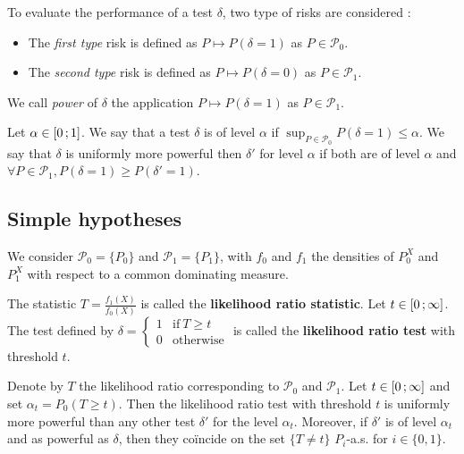 	To evaluate the performance of a test $\delta$, two type of risks are considered :
	\begin{itemize}
		\item[\textbullet] The \emph{first type} risk is defined as $P \mapsto P(\delta = 1)$ as $P \in \mathcal{P}_0$.
		\item[\textbullet] The \emph{second type} risk is defined as $P \mapsto P(\delta = 0)$ as $P \in \mathcal{P}_1$.
	\end{itemize}
	We call \emph{power} of $\delta$ the application $P \mapsto P(\delta = 1)$ as $P \in \mathcal{P}_1$.

	\begin{defn}
		Let $\alpha \in \mathopen{}\mathclose{\left[0\mathclose{}\mathpunct{};1\right]}$.
		We say that a test $\delta$ is of level $\alpha$ if $\sup_{P \in \mathcal{P}_0} P(\delta = 1) \leq \alpha$.
		We say that $\delta$ is uniformly more powerful then $\delta'$ for level $\alpha$ if both are of level $\alpha$ and $\forall P \in \mathcal{P}_1, P(\delta = 1) \geq P(\delta' = 1)$.
	\end{defn}


\subsection{Simple hypotheses}

	We consider $\mathcal{P}_0 = \{ P_0 \}$ and $\mathcal{P}_1 = \{ P_1 \}$, with $f_0$ and $f_1$ the densities of $P_0^X$ and $P_1^X$ with respect to a common dominating measure.
	
	\begin{defn}
		The statistic $T = \frac{f_1(X)}{f_0(X)}$ is called the \textbf{likelihood ratio statistic}.
		Let $t \in \mathopen{}\mathclose{\left[0\mathclose{}\mathpunct{};\infty\right]}$.
		The test defined by
		$\delta = \left\{ \begin{array}{ll}
			1 & \text{if}\ T \geq t \\
			0 & \text{otherwise}
			\end{array}\right. $
		is called the \textbf{likelihood ratio test} with threshold $t$.
	\end{defn}
	
	\begin{thm}
		Denote by $T$ the likelihood ratio corresponding to $\mathcal{P}_0$ and $\mathcal{P}_1$.
		Let $t \in \mathopen{}\mathclose{\left[0\mathclose{}\mathpunct{};\infty\right]}$ and set $\alpha_t = P_0(T \geq t)$.
		Then the likelihood ratio test with threshold $t$ is uniformly more powerful than any other test $\delta'$ for the level $\alpha_t$.
		Moreover, if $\delta'$ is of level $\alpha_t$ and as powerful as $\delta$, then they coïncide on the set $\{ T \neq t \}$ $P_i$-a.s. for $i \in \{ 0, 1 \}$.
	\end{thm}


